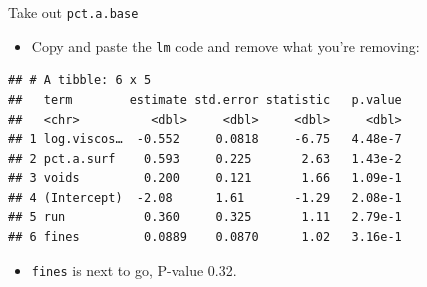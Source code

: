 \documentclass[ignorenonframetext,]{beamer}
\newenvironment{Shaded}{\begin{snugshade}}{\end{snugshade}}
\newcommand{\DataTypeTok}[1]{\textcolor[rgb]{0.13,0.29,0.53}{#1}}
\newcommand{\DecValTok}[1]{\textcolor[rgb]{0.00,0.00,0.81}{#1}}
\newcommand{\FloatTok}[1]{\textcolor[rgb]{0.00,0.00,0.81}{#1}}
\newcommand{\KeywordTok}[1]{\textcolor[rgb]{0.13,0.29,0.53}{\textbf{#1}}}
\newcommand{\NormalTok}[1]{#1}
\newcommand{\OperatorTok}[1]{\textcolor[rgb]{0.81,0.36,0.00}{\textbf{#1}}}
\newcommand{\StringTok}[1]{\textcolor[rgb]{0.31,0.60,0.02}{#1}}
\providecommand{\tightlist}{%
  \setlength{\itemsep}{0pt}\setlength{\parskip}{0pt}}
\begin{document}
\begin{frame}[fragile]{Take out \texttt{pct.a.base}}
\protect\hypertarget{take-out-pct.a.base}{}

\begin{itemize}
\tightlist
\item
  Copy and paste the \texttt{lm} code and remove what you're removing:
\end{itemize}

\begin{Shaded}
\end{Shaded}

\begin{verbatim}
## # A tibble: 6 x 5
##   term        estimate std.error statistic   p.value
##   <chr>          <dbl>     <dbl>     <dbl>     <dbl>
## 1 log.viscos…  -0.552     0.0818     -6.75   4.48e-7
## 2 pct.a.surf    0.593     0.225       2.63   1.43e-2
## 3 voids         0.200     0.121       1.66   1.09e-1
## 4 (Intercept)  -2.08      1.61       -1.29   2.08e-1
## 5 run           0.360     0.325       1.11   2.79e-1
## 6 fines         0.0889    0.0870      1.02   3.16e-1
\end{verbatim}

\begin{itemize}
\tightlist
\item
  \texttt{fines} is next to go, P-value 0.32.
\end{itemize}

\end{frame}
\end{document}
